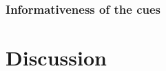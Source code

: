 \subsubsection{Informativeness of the cues}
\label{sec:engsp:results:stats}

\section{Discussion}
\label{sec:engsp:discussion}

